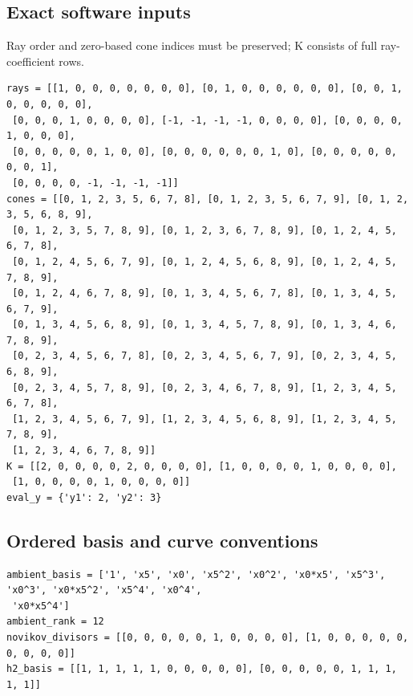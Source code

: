 \documentclass[10pt,a4paper]{article}
\begin{document}
\subsection*{Exact software inputs}
Ray order and zero-based cone indices must be preserved; K consists of full ray-coefficient rows.
\begin{lstlisting}
rays = [[1, 0, 0, 0, 0, 0, 0, 0], [0, 1, 0, 0, 0, 0, 0, 0], [0, 0, 1, 0, 0, 0, 0, 0],
 [0, 0, 0, 1, 0, 0, 0, 0], [-1, -1, -1, -1, 0, 0, 0, 0], [0, 0, 0, 0, 1, 0, 0, 0],
 [0, 0, 0, 0, 0, 1, 0, 0], [0, 0, 0, 0, 0, 0, 1, 0], [0, 0, 0, 0, 0, 0, 0, 1],
 [0, 0, 0, 0, -1, -1, -1, -1]]
cones = [[0, 1, 2, 3, 5, 6, 7, 8], [0, 1, 2, 3, 5, 6, 7, 9], [0, 1, 2, 3, 5, 6, 8, 9],
 [0, 1, 2, 3, 5, 7, 8, 9], [0, 1, 2, 3, 6, 7, 8, 9], [0, 1, 2, 4, 5, 6, 7, 8],
 [0, 1, 2, 4, 5, 6, 7, 9], [0, 1, 2, 4, 5, 6, 8, 9], [0, 1, 2, 4, 5, 7, 8, 9],
 [0, 1, 2, 4, 6, 7, 8, 9], [0, 1, 3, 4, 5, 6, 7, 8], [0, 1, 3, 4, 5, 6, 7, 9],
 [0, 1, 3, 4, 5, 6, 8, 9], [0, 1, 3, 4, 5, 7, 8, 9], [0, 1, 3, 4, 6, 7, 8, 9],
 [0, 2, 3, 4, 5, 6, 7, 8], [0, 2, 3, 4, 5, 6, 7, 9], [0, 2, 3, 4, 5, 6, 8, 9],
 [0, 2, 3, 4, 5, 7, 8, 9], [0, 2, 3, 4, 6, 7, 8, 9], [1, 2, 3, 4, 5, 6, 7, 8],
 [1, 2, 3, 4, 5, 6, 7, 9], [1, 2, 3, 4, 5, 6, 8, 9], [1, 2, 3, 4, 5, 7, 8, 9],
 [1, 2, 3, 4, 6, 7, 8, 9]]
K = [[2, 0, 0, 0, 0, 2, 0, 0, 0, 0], [1, 0, 0, 0, 0, 1, 0, 0, 0, 0],
 [1, 0, 0, 0, 0, 1, 0, 0, 0, 0]]
eval_y = {'y1': 2, 'y2': 3}
\end{lstlisting}
\subsection*{Ordered basis and curve conventions}
\begin{lstlisting}
ambient_basis = ['1', 'x5', 'x0', 'x5^2', 'x0^2', 'x0*x5', 'x5^3', 'x0^3', 'x0*x5^2', 'x5^4', 'x0^4',
 'x0*x5^4']
ambient_rank = 12
novikov_divisors = [[0, 0, 0, 0, 0, 1, 0, 0, 0, 0], [1, 0, 0, 0, 0, 0, 0, 0, 0, 0]]
h2_basis = [[1, 1, 1, 1, 1, 0, 0, 0, 0, 0], [0, 0, 0, 0, 0, 1, 1, 1, 1, 1]]
\end{lstlisting}
\end{document}
